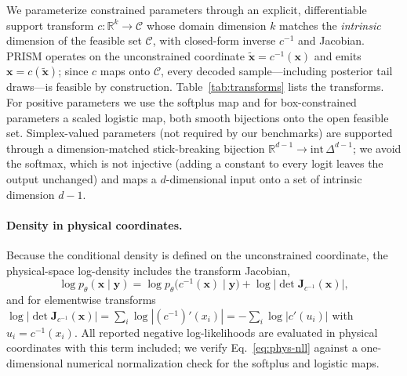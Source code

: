 
We parameterize constrained parameters through an explicit, differentiable
support transform $c:\mathbb{R}^{k}\to\mathcal{C}$ whose domain dimension $k$
matches the \emph{intrinsic} dimension of the feasible set $\mathcal{C}$, with
closed-form inverse $c^{-1}$ and Jacobian. PRISM operates on the unconstrained
coordinate $\tilde{\mathbf{x}}=c^{-1}(\mathbf{x})$ and emits
$\mathbf{x}=c(\tilde{\mathbf{x}})$; since $c$ maps onto $\mathcal{C}$, every
decoded sample---including posterior tail draws---is feasible by construction.
Table~\ref{tab:transforms} lists the transforms. For positive parameters we use
the softplus map and for box-constrained parameters a scaled logistic map, both
smooth bijections onto the open feasible set. Simplex-valued parameters (not
required by our benchmarks) are supported through a dimension-matched
stick-breaking bijection $\mathbb{R}^{d-1}\to\mathrm{int}\,\Delta^{d-1}$; we
avoid the softmax, which is not injective (adding a constant to every logit
leaves the output unchanged) and maps a $d$-dimensional input onto a set of
intrinsic dimension $d-1$.

\paragraph{Density in physical coordinates.}
Because the conditional density is defined on the unconstrained coordinate, the
physical-space log-density includes the transform Jacobian,
\begin{equation}
\log p_\theta(\mathbf{x}\mid\mathbf{y})
=\log p_\theta\big(c^{-1}(\mathbf{x})\mid\mathbf{y}\big)
+\log\big|\det \mathbf{J}_{c^{-1}}(\mathbf{x})\big|,
\label{eq:phys-nll}
\end{equation}
and for elementwise transforms
$\log|\det\mathbf{J}_{c^{-1}}(\mathbf{x})|
=\sum_i\log|(c^{-1})'(x_i)|=-\sum_i\log|c'(u_i)|$ with $u_i=c^{-1}(x_i)$. All
reported negative log-likelihoods are evaluated in physical coordinates with this
term included; we verify Eq.~\eqref{eq:phys-nll} against a one-dimensional
numerical normalization check for the softplus and logistic maps.

